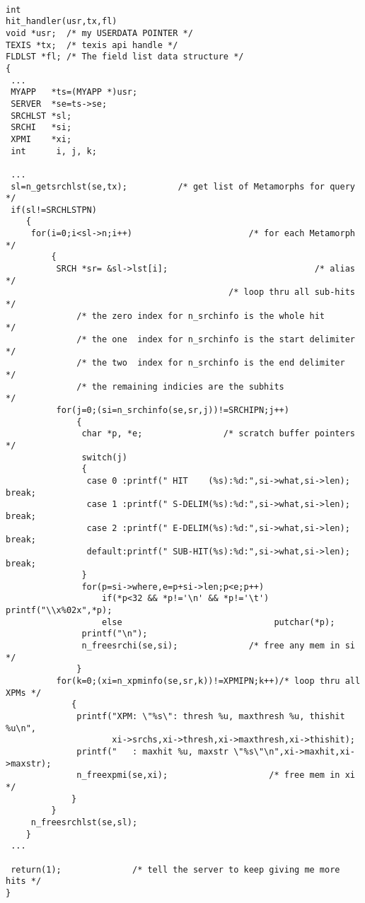 \EXAMPLE
\begin{verbatim}

int
hit_handler(usr,tx,fl)
void *usr;  /* my USERDATA POINTER */
TEXIS *tx;  /* texis api handle */
FLDLST *fl; /* The field list data structure */
{
 ...
 MYAPP   *ts=(MYAPP *)usr;
 SERVER  *se=ts->se;
 SRCHLST *sl;
 SRCHI   *si;
 XPMI    *xi;
 int      i, j, k;

 ...
 sl=n_getsrchlst(se,tx);          /* get list of Metamorphs for query */
 if(sl!=SRCHLSTPN)
    {
     for(i=0;i<sl->n;i++)                       /* for each Metamorph */
         {
          SRCH *sr= &sl->lst[i];                             /* alias */
                                            /* loop thru all sub-hits */
              /* the zero index for n_srchinfo is the whole hit       */
              /* the one  index for n_srchinfo is the start delimiter */
              /* the two  index for n_srchinfo is the end delimiter   */
              /* the remaining indicies are the subhits               */
          for(j=0;(si=n_srchinfo(se,sr,j))!=SRCHIPN;j++)
              {
               char *p, *e;                /* scratch buffer pointers */
               switch(j)
               {
                case 0 :printf(" HIT    (%s):%d:",si->what,si->len); break;
                case 1 :printf(" S-DELIM(%s):%d:",si->what,si->len); break;
                case 2 :printf(" E-DELIM(%s):%d:",si->what,si->len); break;
                default:printf(" SUB-HIT(%s):%d:",si->what,si->len); break;
               }
               for(p=si->where,e=p+si->len;p<e;p++)
                   if(*p<32 && *p!='\n' && *p!='\t') printf("\\x%02x",*p);
                   else                              putchar(*p);
               printf("\n");
               n_freesrchi(se,si);              /* free any mem in si */
              }
          for(k=0;(xi=n_xpminfo(se,sr,k))!=XPMIPN;k++)/* loop thru all XPMs */
             {
              printf("XPM: \"%s\": thresh %u, maxthresh %u, thishit %u\n",
                     xi->srchs,xi->thresh,xi->maxthresh,xi->thishit);
              printf("   : maxhit %u, maxstr \"%s\"\n",xi->maxhit,xi->maxstr);
              n_freexpmi(se,xi);                    /* free mem in xi */
             }
         }
     n_freesrchlst(se,sl);
    }
 ...

 return(1);              /* tell the server to keep giving me more hits */
}

\end{verbatim}

